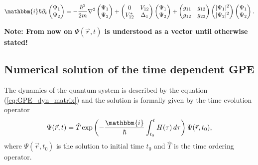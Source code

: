 \documentclass[12pt]{article}
\newcommand{\ic}{\mathbbm{i}}
\begin{document}
\begin{tcolorbox}
\begin{align}
  \ic \hbar \partial_t \begin{pmatrix}
    \Psi_1 \\
    \Psi_2 
  \end{pmatrix} =  -\frac{\hbar^2}{2m}\nabla^2
  \begin{pmatrix}
    \Psi_1 \\
    \Psi_2 
  \end{pmatrix}
  +  \begin{pmatrix}
    0 & V_{12}\\
    V_{12}^* & \Delta_1 
  \end{pmatrix}
  \begin{pmatrix}
    \Psi_1 \\
    \Psi_2 
  \end{pmatrix}+
\begin{pmatrix}
    g_{11}& g_{12}\\
    g_{12} & g_{22} 
  \end{pmatrix}   
   \begin{pmatrix}
    |\Psi_1|^2 \\
    |\Psi_2|^2 
  \end{pmatrix} 
  \begin{pmatrix}
    \Psi_1 \\
    \Psi_2 
  \end{pmatrix}. \label{eq:GPE_dyn_matrix}
\end{align}
\end{tcolorbox}
\textbf{Note: From now on $\Psi(\vec{r},t)$ is understood as a vector until otherwise stated!}
\subsection{Numerical solution of the time dependent GPE}
The dynamics of the quantum system is described by the equation (\ref{eq:GPE_dyn_matrix}) and the solution is formally given by the time evolution operator
\begin{eqnarray}
  \Psi(\vec{r},t) = \hat{T} \exp\left(-\frac{\ic}{\hbar}\int_{t_0}^t H(\tau)\,d\tau\right)
\Psi(\vec{r},t_0) \label{eq:Loesung},
\end{eqnarray}
where $\Psi(\vec{r},t_0)$ is the solution to initial time $t_0$ and
$\hat{T}$ is the time ordering operator. 
\end{document}
